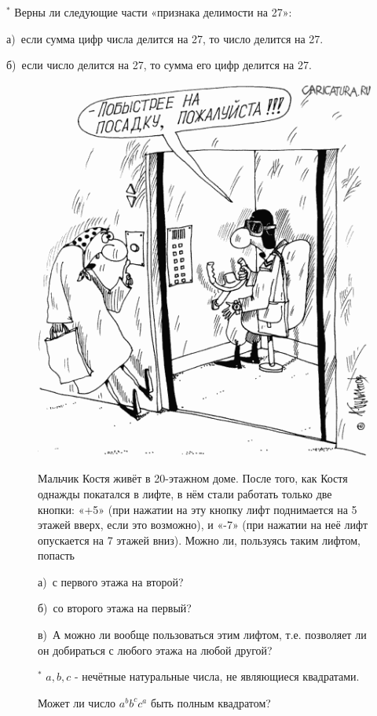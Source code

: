 \begin{thm} $^{\ast}$ 
    Верны ли следующие части «признака делимости на 27»:
    \par
    а)~если сумма цифр числа делится на 27, то число делится на 27.
    \par
    б)~если число делится на 27, то сумма его цифр делится на 27.
\end{thm}
{
\setlength{\intextsep}{0pt}
\begin{figure}[h]
\begin{minipage}[h]{0.29\linewidth}
    \includegraphics[width=0.9\columnwidth]{./img/posadka}
\end{minipage}
\begin{minipage}[h]{0.7\linewidth}\setlength{\parindent}{1.5em}
    \begin{thm}
    Мальчик Костя живёт в 20-этажном доме. После того, как Костя однажды покатался в лифте, в нём стали работать только две кнопки: «+5» (при нажатии на эту кнопку лифт поднимается на 5 этажей вверх, если это возможно), и «-7» (при нажатии на неё лифт опускается на 7 этажей вниз). Можно ли, пользуясь таким лифтом, попасть
    \par
    а)~с первого этажа на второй? 
    \par
    б)~со второго этажа на первый? 
    \par
    в)~А можно ли вообще пользоваться этим лифтом, т.е. позволяет ли он добираться с любого этажа на любой другой?\footnotemark
    \end{thm}

    \begin{thm} $^{\ast}$ 
    $a, b, c$ - нечётные натуральные числа, не являющиеся квадратами.
    \par
    Может ли число $a^b b^c c^a$ быть полным квадратом?
    \end{thm}
\end{minipage}
\end{figure}
}

